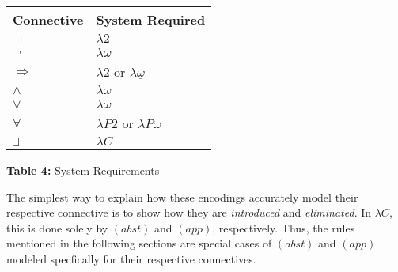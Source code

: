 \documentclass[9pt,preprint,nocopyrightspace,computermodern]{sigplanconf} %
\begin{document}
\begin{center}
  \begin{tabu} {  X[c] | X[c]  }
    \textbf{Connective} & \textbf{System Required} \\[0.05cm]
    \hline
    \(\perp\)  & \(\lambda2\)  \\[0.05cm]
    \hline
    \(\neg\)  &  \(\lambda\omega\) \\[0.05cm]
    \hline
    \(\Rightarrow\)  &  \(\lambda2\) or \(\lambda\underline\omega\) \\[0.05cm]
    \hline
    \(\wedge\)  &  \(\lambda\omega\) \\[0.05cm]
    \hline
    \(\vee\)  &   \(\lambda\omega\) \\[0.05cm]
    \hline
    \(\forall\)  & \(\lambda P2\) or \(\lambda P\underline\omega\) \\[0.05cm]
    \hline
    \(\exists\)  & \(\lambda C\)  \\[0.05cm]
  \end{tabu}\par\smallskip
  \textbf{Table 4:} System Requirements
\end{center}
The simplest way to explain how these encodings accurately model their respective
connective is to show how they are \textit{introduced} and \textit{eliminated}.
In \(\lambda C\), this is done solely by \((abst)\) and \((app)\), respectively.
Thus, the rules mentioned in the following sections are special cases of \((abst)\)
and \((app)\) modeled specfically for their respective connectives.
\end{document}

